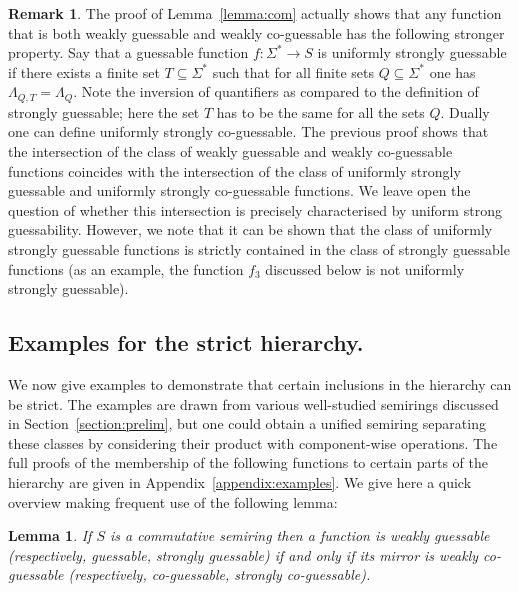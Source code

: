 \documentclass[10pt,a4paper]{amsart}
\newtheorem{lem}[thm]{Lemma}
\theoremstyle{definition}
\newtheorem{rem}[thm]{Remark}
\numberwithin{equation}{section}
\numberwithin{theorem}{section}
\begin{document}
\begin{rem}
\label{rk:universalsg}
The proof of Lemma~\ref{lemma:com} actually shows that any function that is both weakly guessable and weakly co-guessable has the following stronger property. Say that a guessable function $f: \Sigma^* \rightarrow S$ is uniformly strongly guessable if there exists a finite set $T \subseteq \Sigma^*$ such that for all finite sets $Q \subseteq \Sigma^*$ one has $\Lambda_{Q,T} = \Lambda_{Q}$. Note the inversion of quantifiers as compared to the definition of strongly guessable; here the set $T$ has to be the same for all the sets $Q$. Dually one can define uniformly strongly co-guessable. The previous proof shows that the intersection of the class of weakly guessable and weakly co-guessable functions coincides with the intersection of the class of uniformly strongly guessable and uniformly strongly co-guessable functions.  We leave open the question of whether this intersection  is precisely characterised by uniform strong guessability. However, we note that it can be shown that the class of uniformly strongly guessable functions is strictly contained in the class of strongly guessable functions (as an example, the function $f_3$ discussed below is not uniformly strongly guessable).
\end{rem}

\subsection{Examples for the strict hierarchy.}
\label{subsec:strict}

We now give examples to demonstrate that certain inclusions in the hierarchy can be strict. The examples are drawn from various well-studied semirings discussed in Section~\ref{section:prelim}, but one could obtain a unified semiring separating these classes by considering their product with component-wise operations.  The full proofs of the membership of the following functions to certain parts of the hierarchy are given in Appendix~\ref{appendix:examples}. We give here a quick overview making frequent use of the following lemma:


\begin{lem}
\label{lem:com2}
If $S$ is a commutative semiring then a function is weakly guessable (respectively, guessable, strongly guessable) if and only if its mirror is weakly co-guessable (respectively, co-guessable, strongly co-guessable).
\end{lem}
\end{document}
